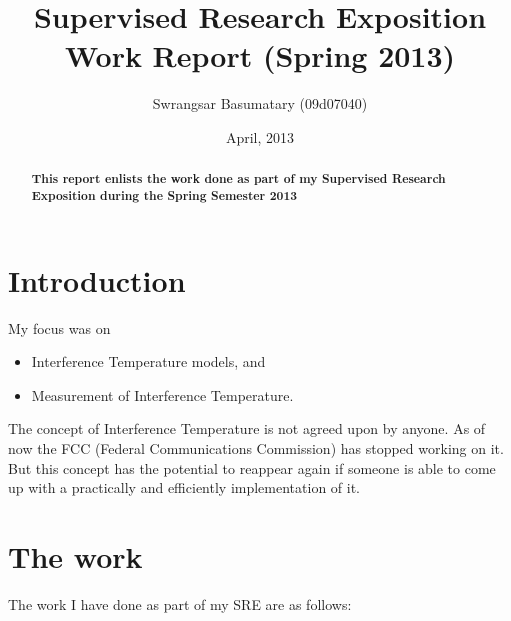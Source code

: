 \documentclass[10pt]{article}
\title{Supervised Research Exposition Work Report (Spring 2013)}
\author{Swrangsar Basumatary (09d07040)}
\date{April, 2013}
\begin{document}
\maketitle

\begin{abstract}
    \textbf{This report enlists the work done as part of my Supervised Research Exposition during the Spring Semester 2013}
\end{abstract}

\section{Introduction}
My focus was on 

\begin{itemize}
    \item Interference Temperature models, and
    \item Measurement of Interference Temperature.
\end{itemize}

The concept of Interference Temperature is not agreed upon by anyone. As of now the FCC (Federal Communications Commission) has stopped working on it. But this concept has the potential to reappear again if someone is able to come up with a practically and efficiently implementation of it.

\section{The work}

The work I have done as part of my SRE are as follows:
\end{document}
